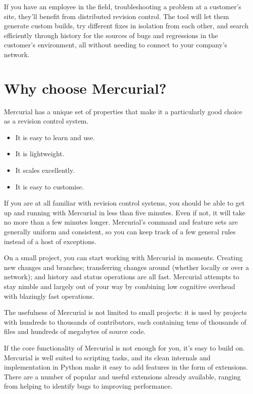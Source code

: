 If you have an employee in the field, troubleshooting a problem at a
customer's site, they'll benefit from distributed revision control.
The tool will let them generate custom builds, try different fixes in
isolation from each other, and search efficiently through history for
the sources of bugs and regressions in the customer's environment, all
without needing to connect to your company's network.

\section{Why choose Mercurial?}

Mercurial has a unique set of properties that make it a particularly
good choice as a revision control system.
\begin{itemize}
\item It is easy to learn and use.
\item It is lightweight.
\item It scales excellently.
\item It is easy to customise.
\end{itemize}

If you are at all familiar with revision control systems, you should
be able to get up and running with Mercurial in less than five
minutes.  Even if not, it will take no more than a few minutes
longer.  Mercurial's command and feature sets are generally uniform
and consistent, so you can keep track of a few general rules instead
of a host of exceptions.

On a small project, you can start working with Mercurial in moments.
Creating new changes and branches; transferring changes around
(whether locally or over a network); and history and status operations
are all fast.  Mercurial attempts to stay nimble and largely out of
your way by combining low cognitive overhead with blazingly fast
operations.

The usefulness of Mercurial is not limited to small projects: it is
used by projects with hundreds to thousands of contributors, each
containing tens of thousands of files and hundreds of megabytes of
source code.

If the core functionality of Mercurial is not enough for you, it's
easy to build on.  Mercurial is well suited to scripting tasks, and
its clean internals and implementation in Python make it easy to add
features in the form of extensions.  There are a number of popular and
useful extensions already available, ranging from helping to identify
bugs to improving performance.


